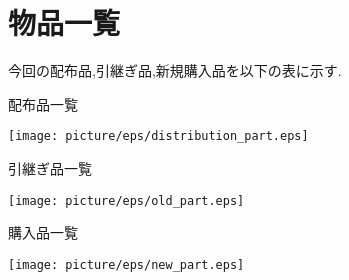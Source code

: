 \section{物品一覧} 
今回の配布品,引継ぎ品,新規購入品を以下の表に示す.
\begin{table}[h]
	\centering
	\caption{配布品一覧}
	\texttt{[image: picture/eps/distribution\_part.eps]}
    \label{distribution}
\end{table}

\begin{table}[h]
	\centering
	\caption{引継ぎ品一覧}
	\texttt{[image: picture/eps/old\_part.eps]}
 \label{old}
\end{table}

\begin{table}[h]
	\centering
	\caption{購入品一覧}
	\texttt{[image: picture/eps/new\_part.eps]}
    \label{new}
\end{table}

